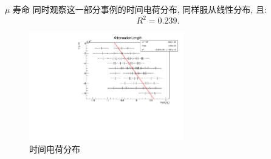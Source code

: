 \documentclass[10pt]{beamer}
\begin{document}
\begin{frame}[label={sec:orgdab201b}]{\(\mu\) 寿命}
同时观察这一部分事例的时间电荷分布, 同样服从线性分布, 且:
\begin{equation}
\label{eq:8}
R^2 = 0.239.
\end{equation}
\begin{figure}[htbp]
\centering
\includegraphics[width=0.6\textwidth]{../../DetectorPerform/AttenuationLength/figs/ReAttenuationLength.pdf}
\caption{时间电荷分布}
\end{figure}
\end{frame}
\end{document}
